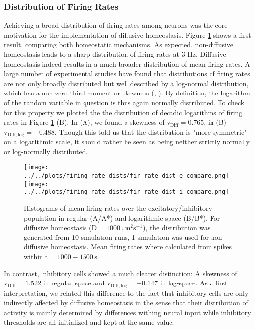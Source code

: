 \documentclass[10pt,a4paper]{article}
\begin{document}
\subsubsection{Distribution of Firing Rates}\label{Fir_Dist_Section}
Achieving a broad distribution of firing rates among neurons was the core motivation for the implementation of diffusive homeostasis. Figure \ref{Fir_Rate_Dist_Compare} shows a first result, comparing both homeostatic mechanisms. As expected, non-diffusive homeostasis leads to a sharp distribution of firing rates at 3 Hz. Diffusive homeostasis indeed results in a much broader distribution of mean firing rates. A large number of experimental studies have found that distributions of firing rates are not only broadly distributed but well described by a log-normal distribution, which has a non-zero third moment or skewness (\cite{Buzsaki_Fir_Rates_2014}, \cite{Wohrer_Fir_Rates_2012}). By definition, the logarithm of the random variable in question is thus again normally distributed. To check for this property we plotted the the distribution of decadic logarithms of firing rates in Figure \ref{Fir_Rate_Dist_Compare} (B). In (A), we found a skewness of $\mathrm{v_{Diff} = 0.765}$, in (B) $\mathrm{v_{Diff,log} = -0.488}$. Though this told us that the distribution is "more symmetric" on a logarithmic scale, it should rather be seen as being neither strictly normally or log-normally distributed.  
\begin{figure}
\texttt{[image: ../../plots/firing\_rate\_dists/fir\_rate\_dist\_e\_compare.png]}
\texttt{[image: ../../plots/firing\_rate\_dists/fir\_rate\_dist\_i\_compare.png]}
\caption{Histograms of mean firing rates over the excitatory/inhibitory population in regular (A/A*) and logarithmic space (B/B*). For diffusive homeostasis ($\mathrm{D=1000\, \mu m^2 s^{-1}}$), the distribution was generated from 10 simulation runs, 1 simulation was used for non-diffusive homeostasis. Mean firing rates where calculated from spikes within $\mathrm{t=1000-1500\,s}$.}
\label{Fir_Rate_Dist_Compare}
\end{figure}
In contrast, inhibitory cells showed a much clearer distinction: A skewness of $\mathrm{v_{Diff} = 1.522}$ in regular space and $\mathrm{v_{Diff,log} = -0.147}$ in log-space. As a first interpretation, we related this difference to the fact that inhibitory cells are only indirectly affected by diffusive homeostasis in the sense that their distribution of activity is mainly determined by differences withing neural input while inhibitory thresholds are all initialized and kept at the same value.
\end{document}
